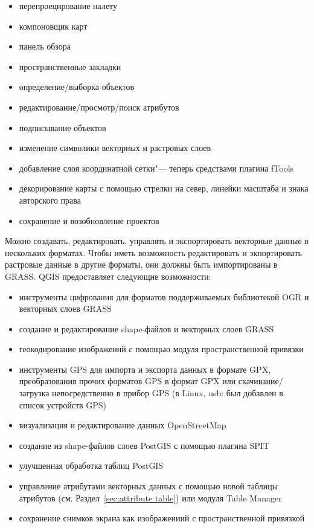 \begin{itemize}[label=--]
\item перепроецирование налету
\item компоновщик карт
\item панель обзора
\item пространственные закладки
\item определение/выборка объектов
\item редактирование/просмотр/поиск атрибутов
\item подписывание объектов
\item изменение символики векторных и растровых слоев
\item добавление слоя координатной сетки"--- теперь средствами плагина
fTools
\item декорирование карты с помощью стрелки на север, линейки масштаба
и знака авторского права
\item сохранение и возобновление проектов
\end{itemize}


Можно создавать, редактировать, управлять и экспортировать векторные
данные в нескольких форматах. Чтобы иметь возможность редактировать и
экпортировать растровые данные в другие форматы, они должны быть
импортированы в GRASS. QGIS предоставляет следующие возможности:

\begin{itemize}[label=--]
\item инструменты цифрования для форматов поддерживаемых библиотекой OGR
и векторных слоев GRASS
\item создание и редактирование shape-файлов и векторных слоев GRASS
\item геокодирование изображений с помощью модуля пространственной
привязки
\item инструменты GPS для импорта и экспорта данных в формате GPX,
преобразования прочих форматов GPS в формат GPX или скачивание/загрузка
непосредственно в прибор GPS (в Linux, usb: был добавлен в список
устройств GPS)
\item визуализация и редактирование данных OpenStreetMap
\item создание из shape-файлов слоев PostGIS с помощью плагина SPIT
\item улучшенная обработка таблиц PostGIS
\item управление атрибутами векторных данных с помощью новой таблицы
атрибутов (см. Раздел~\ref{sec:attribute table}) или модуля Table Manager
\item сохранение снимков экрана как изображениий с пространственной
привязкой
\end{itemize}

